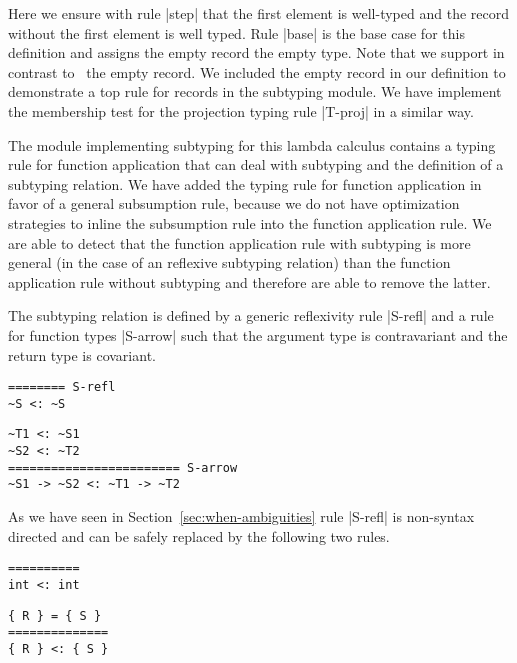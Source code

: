 Here we ensure with rule \code|step| that the first element is
well-typed and the record without the first element is well
typed. Rule \code|base| is the base case for this definition and
assigns the empty record the empty type. Note that we support in
contrast to~\cite{Pierce:2002:TPL:509043} the empty record. We
included the empty record in our definition to demonstrate a top rule
for records in the subtyping module. We have implement the membership
test for the projection typing rule \code|T-proj| in a similar way.

The module implementing subtyping for this lambda calculus contains a
typing rule for function application that can deal with subtyping and
the definition of a subtyping relation. We have added the typing rule
for function application in favor of a general subsumption rule,
because we do not have optimization strategies to inline the
subsumption rule into the function application rule. We are able to
detect that the function application rule with subtyping is more
general (in the case of an reflexive subtyping relation) than the
function application rule without subtyping and therefore are able to
remove the latter.

The subtyping relation is defined by a generic reflexivity rule
\code|S-refl| and a rule for function types \code|S-arrow| such that
the argument type is contravariant and the return type is
covariant.

\begin{minipage}{.3\linewidth}
\begin{lstlisting}[language=sltc]
======== S-refl
~S <: ~S
\end{lstlisting}
\end{minipage}
\begin{minipage}{.6\linewidth}
\begin{lstlisting}[language=sltc]
~T1 <: ~S1
~S2 <: ~T2    
======================== S-arrow 
~S1 -> ~S2 <: ~T1 -> ~T2
\end{lstlisting}
\end{minipage}

As we have seen in Section~\ref{sec:when-ambiguities} rule
\code|S-refl| is non-syntax directed and can be safely replaced by the
following two rules.

\begin{minipage}{.3\linewidth}
\begin{lstlisting}[language=sltc]
==========
int <: int
\end{lstlisting}
\end{minipage}
\begin{minipage}{.3\linewidth}
\begin{lstlisting}[language=sltc]
{ R } = { S }
==============
{ R } <: { S }
\end{lstlisting}
\end{minipage}

